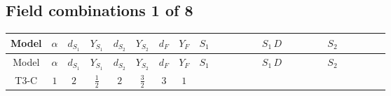 \documentclass[8pt]{article}
\begin{document}
\begin{landscape}
\subsection*{Field combinations 1 of 8}
\begin{longtable}{@{}cccccccc >{\raggedright\arraybackslash}p{0.21\linewidth} >{\raggedright\arraybackslash}p{0.21\linewidth} >{\raggedright\arraybackslash}p{0.21\linewidth}@{}}
\toprule
Model & $\alpha$ & $d_{S_1}$ & $Y_{S_1}$ & $d_{S_2}$ & $Y_{S_2}$ & $d_F$ & $Y_F$ & $S_1$ & $S_1\,D$ & $S_2$ \\
\midrule
\endfirsthead
\toprule
Model & $\alpha$ & $d_{S_1}$ & $Y_{S_1}$ & $d_{S_2}$ & $Y_{S_2}$ & $d_F$ & $Y_F$ & $S_1$ & $S_1\,D$ & $S_2$ \\
\midrule
\endhead
T3-C & $1$ & $2$ & $\frac{1}{2}$ & $2$ & $\frac{3}{2}$ & $3$ & $1$ & \scriptsize\adjustbox{max width=\linewidth}{$\begin{gathered} -C_{S_1^\dagger S_1} S_{1,j_1} S_{1,j_1}{}^{\dagger } \\ +\frac{1}{2} \sqrt{3} C_{S_1^\dagger S_1} \hbar  \overline{y_{1,i_1,r_1}} S_{1,j_1} y_{1,i_1,r_1} S_{1,j_1}{}^{\dagger } \\ +\frac{\sqrt{3} C_{S_1^\dagger S_1} \hbar  \overline{y_{1,i_1,r_1}} S_{1,j_1} y_{1,i_1,r_1} S_{1,j_1}{}^{\dagger }}{\epsilon }\end{gathered}$} & \scriptsize\adjustbox{max width=\linewidth}{$\begin{gathered} +D_{\mu _1}\left(S_{1,j_1}\right){}^{\dagger } D_{\mu _1}\left(S_{1,j_1}\right)\end{gathered}$} & \scriptsize\adjustbox{max width=\linewidth}{$\begin{gathered} -C_{S_2^\dagger S_2} S_{2,j_1} S_{2,j_1}{}^{\dagger } \\ +\frac{1}{2} \sqrt{3} C_{S_2^\dagger S_2} \hbar  \overline{y_{2,i_1,r_1}} S_{2,j_1} y_{2,i_1,r_1} S_{2,j_1}{}^{\dagger } \\ +\frac{\sqrt{3} C_{S_2^\dagger S_2} \hbar  \overline{y_{2,i_1,r_1}} S_{2,j_1} y_{2,i_1,r_1} S_{2,j_1}{}^{\dagger }}{\epsilon }\end{gathered}$} \\

\end{longtable}
\end{landscape}
\end{document}
